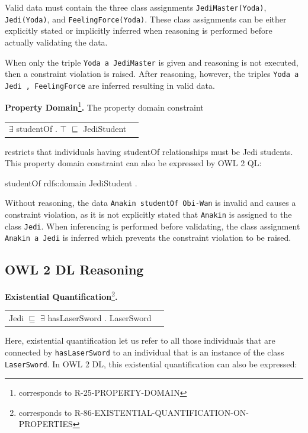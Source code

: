 \documentclass{llncs}
\newcommand{\ms}[1]{\texttt{#1}}
\newenvironment{DL}{
  \scriptsize
  \sffamily
  \vspace{0.3cm}
  \begin{tabular}{r l}

}{
  \end{tabular}
  \linebreak
}
\begin{document}
Valid data must contain the three class assignments \ms{JediMaster(Yoda)}, \ms{Jedi(Yoda)}, and \ms{FeelingForce(Yoda)}.
These class assignments can be either explicitly stated or implicitly inferred when reasoning is performed before actually validating the data.

When only the triple \ms{Yoda a JediMaster} is given and reasoning is not executed, then a constraint violation is raised.
After reasoning, however, the triples \ms{Yoda a Jedi , FeelingForce} are inferred resulting in valid data. 

\textbf{Property Domain}\footnote{corresponds to R-25-PROPERTY-DOMAIN}\textbf{.}
The property domain constraint

\begin{DL}
$\exists$ studentOf . $\top$ $\sqsubseteq$ JediStudent \\
\end{DL}

restricts that individuals having studentOf relationships must be Jedi students.
This property domain constraint can also be expressed by OWL 2 QL:

\begin{ex}
studentOf rdfs:domain JediStudent .
\end{ex}

Without reasoning, the data \ms{Anakin studentOf Obi-Wan} is invalid and causes a constraint violation, as it is not explicitly stated that \ms{Anakin} is assigned to the class \ms{Jedi}. 
When inferencing is performed before validating, the class assignment \ms{Anakin a Jedi} is inferred which prevents the constraint violation to be raised.

\subsection{OWL 2 DL Reasoning}

\textbf{Existential Quantification}\footnote{corresponds to R-86-EXISTENTIAL-QUANTIFICATION-ON-PROPERTIES}\textbf{.}

\begin{center}
\begin{DL}
Jedi $\sqsubseteq$ $\exists$ hasLaserSword . LaserSword
\end{DL}
\end{center}

Here, existential quantification let us refer to all those individuals that are connected by \ms{hasLaserSword} to an individual that is an instance of the class \ms{LaserSword}.
In OWL 2 DL, this existential quantification can also be expressed:
\end{document}
